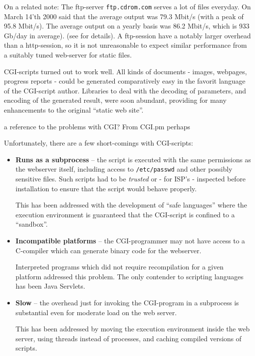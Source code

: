 On a related note: The ftp-server \texttt{ftp.cdrom.com} serves a lot
of files everyday.  On March 14'th 2000
 said that the average output was 79.3 Mbit/s (with a
peak of 95.8 Mbit/s).  The average output on a yearly basis was 86.2
Mbit/s, which is 933 Gb/day in average).
(see  for details).  A
ftp-session have a notably larger overhead than a http-session, so it
is not unreasonable to expect similar performance from a suitably
tuned web-server for static files.


CGI-scripts turned out to work well.  All kinds of documents - images,
webpages, progress reports - could be generated comparatively easy in
the favorit language of the CGI-script author.  Libraries to deal with
the decoding of parameters, and encoding of the generated result, were
soon abundant, providing for many enhancements to the original
``static web site''.

\textsf{a reference to the problems with CGI?  From CGI.pm perhaps}

Unfortunately, there are a few short-comings with CGI-scripts:

\begin{itemize}
\item \textbf{Runs as a subprocess} -- the script is executed with the
  same permissions as the webserver itself, including access to
  \texttt{/etc/passwd} and other possibly sensitive files.  Such
  scripts had to be \textit{trusted} or - for ISP's - inspected before
  installation to ensure that the script would behave properly.

  This has been addressed with the development of ``safe languages''
  where the execution environment is guaranteed that the CGI-script is
  confined to a ``sandbox''.
  
\item \textbf{Incompatible platforms} -- the CGI-programmer may not
  have access to a C-compiler which can generate binary code for the
  webserver.

  Interpreted programs which did not require recompilation for a given
  platform addressed this problem.   The only contender to scripting
  languages has been Java Servlets.
  
\item \textbf{Slow} -- the overhead just for invoking the CGI-program
  in a subprocess is substantial even for moderate load on the web
  server.

  This has been addressed by moving the execution environment inside
  the web server, using threads instead of processes, and caching
  compiled versions of scripts.  

\end{itemize}

